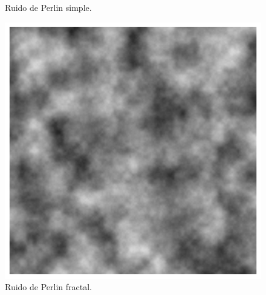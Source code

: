 \begin{itemize}
\begin{itemize}
\begin{figure}[t]
\begin{minipage}[t]{0.7\textwidth}
\begin{minipage}[t]{0.45\linewidth}
                                \caption{Ruido de Perlin simple.}
                                \label{fig:imagen1}
                            \end{minipage}\hfill
                            \begin{minipage}[t]{0.45\linewidth}
                                \centering
                                \includegraphics[width=\linewidth]{img/perlin-fractal.png}
                                \caption{Ruido de Perlin fractal.}
                                \label{fig:imagen2}
                            \end{minipage}
                        \end{minipage}
                    \end{figure}


\end{itemize}
\end{itemize}
